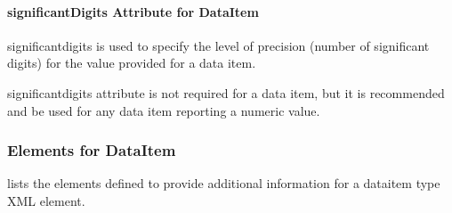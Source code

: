 \documentclass{mtconnect}	%
\begin{document}
\pagebreak

\paragraph{significantDigits Attribute for DataItem}\mbox{}

\gls{significantdigits} is used to specify the level of precision (number of significant digits) for the value provided for a data item.

\gls{significantdigits} attribute is not required for a data item, but it is recommended and \should be used for any data item reporting a numeric value.

\subsubsection{Elements for DataItem}

 lists the elements defined to provide additional information for a \gls{dataitem} type XML element.
\end{document}
